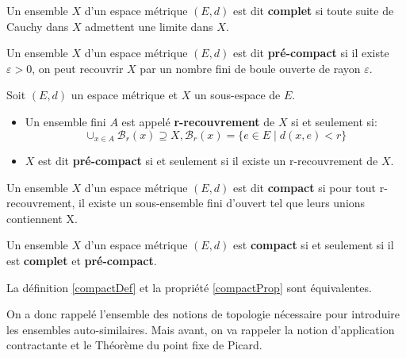 \documentclass[a4paper, 12pt]{report}
\begin{document}
			\begin{definition}
				Un ensemble $X$ d'un espace métrique $(E,d)$ est dit \textbf{complet} si toute suite de Cauchy dans $X$ admettent une limite dans $X$.
				\label{espMetriqueDef}
			\end{definition}
			
			\begin{definition}
				Un ensemble $X$ d'un espace métrique $(E,d)$ est dit \textbf{pré-compact} si il existe $\varepsilon >0$, on peut recouvrir $X$ par un nombre fini de boule ouverte de rayon $\varepsilon$.
			\end{definition}
			
			\begin{definition}
				Soit $(E,d)$ un espace métrique et $X$ un sous-espace de $E$.
				\begin{itemize}
					\item Un ensemble fini $A$ est appelé \textbf{r-recouvrement} de $X$ si et seulement si:
					\begin{equation*}
						\cup_{x\in A} \mathcal{B}_r(x)\supseteq X,\mathcal{B}_r(x)=\{e\in E\mid d(x,e)<r\}
					\end{equation*}
					\item $X$ est dit \textbf{pré-compact} si et seulement si il existe un r-recouvrement de $X$.
				\end{itemize}
			\end{definition}
			
			\begin{definition}
			\label{compactDef}
				Un ensemble $X$ d'un espace métrique $(E,d)$ est dit \textbf{compact} si pour tout r-recouvrement, il existe un sous-ensemble fini d'ouvert tel que leurs unions contiennent X.
			\end{definition}
			
			\begin{prop}
			\label{compactProp}
				Un ensemble $X$ d'un espace métrique $(E,d)$ est \textbf{compact} si et seulement si il est \textbf{complet} et \textbf{pré-compact}.
			\end{prop}
			
			\begin{remark*}
				La définition \ref{compactDef} et la propriété \ref{compactProp} sont équivalentes.
			\end{remark*}

			

			\hspace{.7 cm} On a donc rappelé l'ensemble des notions de topologie nécessaire pour introduire les ensembles auto-similaires. Mais avant, on va rappeler la notion d'application contractante et le Théorème du point fixe de Picard.
			
\end{document}
